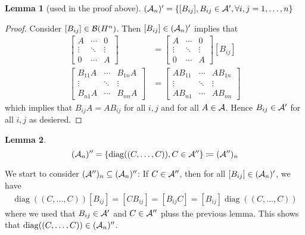 \documentclass[10pt,english,a4paper]{article}
\theoremstyle{definition}
\newtheorem*{lemma}{Lemma}
\DeclareMathOperator{\diag}{diag}
\begin{document}
\begin{lemma}[used in the proof above]
    $(\mathcal{A}_n)' = \{[B_{ij}], B_{ij} \in \mathcal{A}', \forall i,j = 1,\ldots,n\}$
\end{lemma}
\begin{proof}
    Consider $[B_{ij}] \in \mathcal{B}(H^n)$. 
Then $[B_{ij}] \in (\mathcal{A}_n)'$ implies that 
\begin{align*}
    [B_{ij}]
\begin{bmatrix} A &\cdots & 0 \\ \vdots &\ddots &\vdots\\ 0 &\cdots &A \end{bmatrix}
&= 
\begin{bmatrix} A &\cdots & 0 \\ \vdots &\ddots &\vdots\\ 0 &\cdots &A \end{bmatrix}
[B_{ij}] \\
\begin{bmatrix} B_{11}A &\cdots & B_{1n}A \\ \vdots &\ddots &\vdots\\ B_{n1}A &\cdots &B_{nn}A \end{bmatrix}
&= 
\begin{bmatrix} AB_{11} &\cdots & AB_{1n} \\ \vdots &\ddots &\vdots\\ AB_{n1} &\cdots &AB_{nn} \end{bmatrix}
\end{align*}
which implies that 
$B_{ij}A = AB_{ij}$ for all $i,j$ and for all $A \in \mathcal{A}$. Hence
$B_{ij} \in \mathcal{A}'$ for all $i,j$ as desiered. 
\end{proof}

\begin{lemma}
    \[(\As_n)'' = \left\{\diag((C,\ldots, C)), C \in \As''\right\} \coloneqq (\As'')_n\]
\end{lemma}
We start to consider $(\mathcal{A}'')_n\subseteq (\mathcal{A}_n)''$: If $C \in \mathcal{A}''$, then for all 
$[B_{ij}] \in (\mathcal{A}_n)'$, we have 
\begin{align*}
    \diag((C,\ldots, C))[B_{ij}] = [CB_{ij}] = [B_{ij}C] = [B_{ij}]\diag((C,\ldots,C))
\end{align*}
where we used that $B_{ij}\in \mathcal{A}'$ and $C\in \mathcal{A}''$ pluss the previous lemma.
This shows that 
$\diag((C,\ldots, C)) \in (\As_n)''$.
\end{document}
